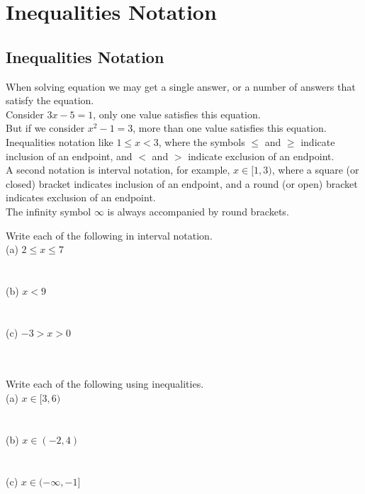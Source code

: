 \chapter{Inequalities Notation}

\section{Inequalities Notation}

When solving equation we may get a single answer, or a number of answers that satisfy the equation. \\

Consider $ 3x - 5 = 1 $, only one value satisfies this equation. \\

But if we consider $ x^2 - 1 = 3 $, more than one value satisfies this equation. \\

Inequalities notation like $ 1 \le x < 3 $, where the symbols $ \le $ and $ \ge $ indicate inclusion of an endpoint, and $ < $ and $ > $ indicate exclusion of an endpoint. \\

A second notation is interval notation, for example, $ x \in [1, 3) $, where a square (or closed) bracket indicates inclusion of an endpoint, and a round (or open) bracket indicates exclusion of an endpoint. \\

The infinity symbol $ \infty $ is always accompanied by round brackets. \\

\begin{exercise}\nonumber
	Write each of the following in interval notation. \\

	(a) $ 2 \le x \le 7 $ \\
	\\
	\\

	(b) $ x < 9 $ \\
	\\
	\\

	(c) $ -3 > x > 0 $ \\
	\\
	\\
\end{exercise}

\begin{exercise}\nonumber
	Write each of the following using inequalities. \\

	(a) $ x \in [3, 6) $ \\
				\\
				\\

				(b) $ x \in (-2, 4) $ \\
				\\
				\\

				(c) $ x \in (-\infty, -1] $ \\
	\\
	\\
\end{exercise}

